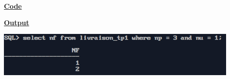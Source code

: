 \newpage
{}

\textbf{\underline{Code}}


\vspace{1cm}
\textbf{\underline{Output}}
\vspace{1cm}
\begin{center}
    \includegraphics[width=0.9\textwidth]{Questions/q10/q10.png}
\end{center}


